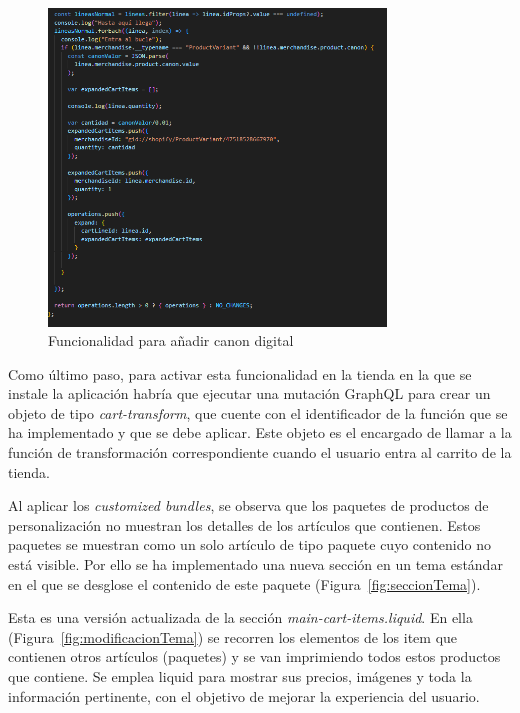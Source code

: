 \documentclass[11pt]{article}
\begin{document}
\begin{figure}[H]
    \centering
    \includegraphics[width=0.8\textwidth]{imagenes-tema/segundaParteFunction.png}
    \caption{\label{fig:runpart2} Funcionalidad para añadir canon digital} 
    \vspace{\fill}
\end{figure}


Como último paso, para activar esta funcionalidad en la tienda en la que se instale la aplicación habría que ejecutar una mutación GraphQL para crear un objeto de tipo \textit{cart-transform}, que cuente con el identificador de la función que se ha implementado
y que se debe aplicar. Este objeto es el encargado de llamar a la función de transformación correspondiente cuando el usuario entra al carrito de la tienda.

Al aplicar los \textit{customized bundles}, se observa que los paquetes de productos de personalización no muestran los detalles de los artículos que contienen. Estos 
paquetes se muestran como un solo artículo de tipo paquete cuyo contenido no está visible. Por ello se ha implementado una nueva sección en un tema estándar en el que 
se desglose el contenido de este paquete (Figura~\ref{fig:seccionTema}).

Esta es una versión actualizada de la sección \textit{main-cart-items.liquid}. En ella (Figura~\ref{fig:modificacionTema}) se recorren los 
elementos de los item que contienen otros artículos (paquetes) y se van imprimiendo todos estos productos que contiene. Se emplea liquid para mostrar sus precios, imágenes y toda la información pertinente,
con el objetivo de mejorar la experiencia del usuario.
\end{document}
